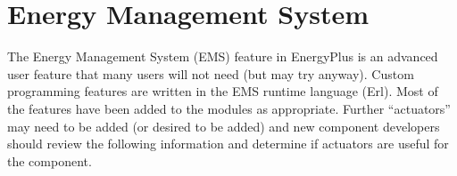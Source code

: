 \chapter{Energy Management System}\label{energy-management-system}

The Energy Management System (EMS) feature in EnergyPlus is an advanced user feature that many users will not need (but may try anyway). Custom programming features are written in the EMS runtime language (Erl). Most of the features have been added to the modules as appropriate. Further ``actuators'' may need to be added (or desired to be added) and new component developers should review the following information and determine if actuators are useful for the component.
